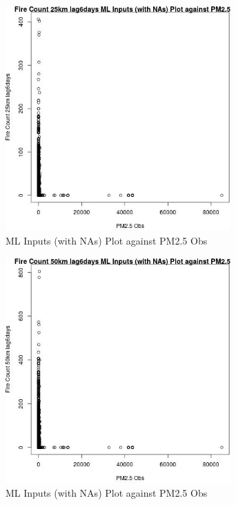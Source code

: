 \begin{figure} 
\centering  
\includegraphics[width=0.77\textwidth]{Code_Outputs/Report_ML_input_PM25_Step4_part_f_de_duplicated_aveswNAs_Fire_Count_25km_lag6daysvPM25_Obs.jpg} 
\caption{\label{fig:Report_ML_input_PM25_Step4_part_f_de_duplicated_aveswNAsFire_Count_25km_lag6daysvPM25_Obs}ML Inputs (with NAs) Plot against PM2.5 Obs} 
\end{figure} 
 

\begin{figure} 
\centering  
\includegraphics[width=0.77\textwidth]{Code_Outputs/Report_ML_input_PM25_Step4_part_f_de_duplicated_aveswNAs_Fire_Count_50km_lag6daysvPM25_Obs.jpg} 
\caption{\label{fig:Report_ML_input_PM25_Step4_part_f_de_duplicated_aveswNAsFire_Count_50km_lag6daysvPM25_Obs}ML Inputs (with NAs) Plot against PM2.5 Obs} 
\end{figure} 
 

